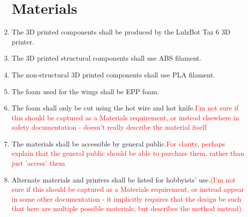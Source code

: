 \documentclass{article}
\begin{document}
	\begin{enumerate}
		
		\section{Materials}
		
		\item The 3D printed components shall be produced by the LulzBot Taz 6 3D printer.\\
		\item The 3D printed structural components shall use ABS filament.\\
		\item The non-structural 3D printed components shall use PLA filament.\\
		\item The foam used for the wings shall be EPP foam.\\
		\item The foam shall only be cut using the hot wire and hot knife.\textcolor{red}{I'm not sure if this should be captured as a 			Materials requirement, or instead elsewhere in safety documentation - doesn't really describe the material itself}\\
		\item The materials shall be accessible by general public.\textcolor{red}{For clarity, perhaps explain that the general public should 		be able to purchase them, rather than just 'access' them}\\
		\item Alternate materials and printers shall be listed for hobbyists' use.\textcolor{red}{(I'm not sure if this should be captured as a 			Materials requirement, or instead appear in some other documentation - it implicitly requires that the design be such that 				here are multiple possible materials, but describes the method instead)}\\

	\end{enumerate}		
\end{document}
